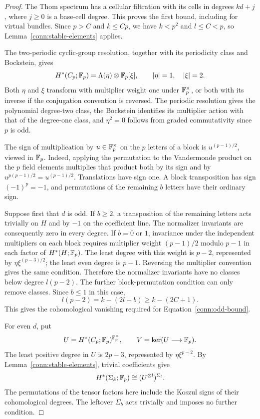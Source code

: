 \begin{proof}
The Thom spectrum has a cellular filtration with its cells in
degrees $kd+j$, where $j\geq0$ is a base-cell degree. This proves
the first bound, including for virtual bundles. Since $p>C$ and
$k\leq Cp$, we have $k<p^2$ and $l\leq C<p$, so
Lemma~\ref{conn:stable-elements} applies.

The two-periodic cyclic-group resolution, together with its
periodicity class and Bockstein, gives
\[
 H^*(C_p;\mathbb F_p)=\Lambda(\eta)\otimes\mathbb F_p[\xi],
 \qquad |\eta|=1,\quad |\xi|=2.
\]
Both $\eta$ and $\xi$ transform with multiplier weight one under
$\mathbb F_p^\times$, or both with its inverse if the conjugation
convention is reversed. The periodic resolution gives the
polynomial degree-two class, the Bockstein identifies its
multiplier action with that of the degree-one class, and
$\eta^2=0$ follows from graded commutativity since $p$ is odd.

The sign of multiplication by $u\in\mathbb F_p^\times$ on the $p$
letters of a block is $u^{(p-1)/2}$, viewed in $\mathbb F_p$.
Indeed, applying the permutation to the Vandermonde product on
the $p$ field elements multiplies that product both by its sign
and by $u^{p(p-1)/2}=u^{(p-1)/2}$. Translations have sign one.
A block transposition has sign $(-1)^p=-1$, and permutations of
the remaining $b$ letters have their ordinary sign.

Suppose first that $d$ is odd. If $b\geq2$, a transposition of
the remaining letters acts trivially on $H$ and by $-1$ on the
coefficient line. The normalizer invariants are consequently zero
in every degree. If $b=0$ or $1$, invariance under the independent
multipliers on each block requires multiplier weight
$(p-1)/2$ modulo $p-1$ in each factor of
$H^*(H;\mathbb F_p)$. The least degree with this weight is $p-2$,
represented by $\eta\xi^{(p-3)/2}$; the least even degree is
$p-1$. Reversing the multiplier convention gives the same
condition. Therefore the normalizer invariants have no classes
below degree $l(p-2)$. The further block-permutation condition
can only remove classes. Since $b\leq1$ in this case,
\[
 l(p-2)=k-(2l+b)\geq k-(2C+1).
\]
This gives the cohomological vanishing required for
Equation~\eqref{conn:odd-bound}.

For even $d$, put
\[
 U=H^*(C_p;\mathbb F_p)^{\mathbb F_p^\times},\qquad
 V=\ker(U\longrightarrow\mathbb F_p).
\]
The least positive degree in $U$ is $2p-3$, represented by
$\eta\xi^{p-2}$. By Lemma~\ref{conn:stable-elements}, trivial
coefficients give
\[
 H^*(\Sigma_k;\mathbb F_p)\cong(U^{\otimes l})^{\Sigma_l}.
\]
The permutations of the tensor factors here include the Koszul
signs of their cohomological degrees. The leftover $\Sigma_b$
acts trivially and imposes no further condition.


\end{proof}
